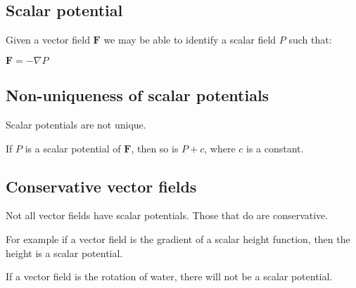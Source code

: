 
\subsection{Scalar potential}

Given a vector field \(\mathbf F\) we may be able to identify a scalar field \(P\) such that:

\(\mathbf F=-\nabla P\)

\subsection{Non-uniqueness of scalar potentials}

Scalar potentials are not unique.

If \(P\) is a scalar potential of \(\mathbf F\), then so is \(P+c\), where \(c\) is a constant.

\subsection{Conservative vector fields}

Not all vector fields have scalar potentials. Those that do are conservative.

For example if a vector field is the gradient of a scalar height function, then the height is a scalar potential.

If a vector field is the rotation of water, there will not be a scalar potential.


